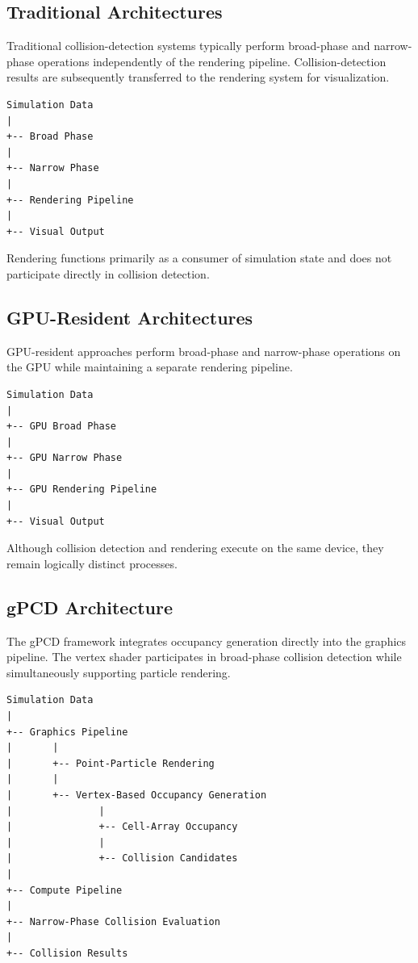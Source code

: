 \subsection{Traditional Architectures}

Traditional collision-detection systems typically perform broad-phase
and narrow-phase operations independently of the rendering pipeline.
Collision-detection results are subsequently transferred to the
rendering system for visualization.

\begin{verbatim}
Simulation Data
|
+-- Broad Phase
|
+-- Narrow Phase
|
+-- Rendering Pipeline
|
+-- Visual Output
\end{verbatim}

Rendering functions primarily as a consumer of simulation state and
does not participate directly in collision detection.

\subsection{GPU-Resident Architectures}

GPU-resident approaches perform broad-phase and narrow-phase operations
on the GPU while maintaining a separate rendering pipeline.

\begin{verbatim}
Simulation Data
|
+-- GPU Broad Phase
|
+-- GPU Narrow Phase
|
+-- GPU Rendering Pipeline
|
+-- Visual Output
\end{verbatim}

Although collision detection and rendering execute on the same device,
they remain logically distinct processes.

\subsection{gPCD Architecture}

The gPCD framework integrates occupancy generation directly into the
graphics pipeline. The vertex shader participates in broad-phase collision
detection while simultaneously supporting particle rendering.

\begin{verbatim}
Simulation Data
|
+-- Graphics Pipeline
|       |
|       +-- Point-Particle Rendering
|       |
|       +-- Vertex-Based Occupancy Generation
|               |
|               +-- Cell-Array Occupancy
|               |
|               +-- Collision Candidates
|
+-- Compute Pipeline
|
+-- Narrow-Phase Collision Evaluation
|
+-- Collision Results
\end{verbatim}

